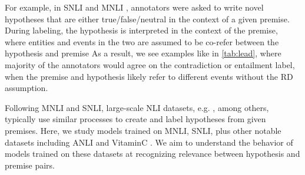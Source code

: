 For example, in SNLI \cite{bowman-etal-2015-large} and MNLI \cite{williams-etal-2018-broad}, annotators were asked to write novel hypotheses that are either true/false/neutral in the context of a given premise. During  labeling, the hypothesis is interpreted in the context of the premise, where entities and events in the two are assumed to be co-refer between the hypothesis and premise
As a result, we see examples like in \autoref{tab:lead}, where majority of the annotators would agree on the contradiction or entailment label, when the premise and hypothesis likely refer to different events without the RD assumption.  

Following
MNLI and SNLI, large-scale NLI datasets, e.g. \citet{marelli-etal-2014-sick, Khot2018SciTaiLAT, conneau-etal-2018-xnli}, among others,
typically use similar processes to create and label hypotheses from given premises. 
Here, we study models trained on MNLI, SNLI, plus other notable datasets including ANLI \cite{nie-etal-2020-adversarial} and VitaminC \cite{schuster-etal-2021-get}. We aim to understand the behavior of models trained on these datasets at recognizing relevance between hypothesis and premise pairs.










